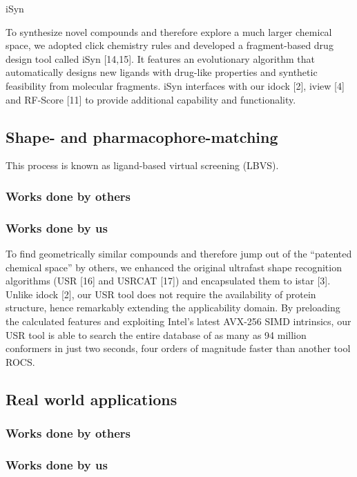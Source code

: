 \documentclass[a4paper,12pt]{article}
\begin{document}
iSyn \cite{1409,1387}

To synthesize novel compounds and therefore explore a much larger chemical space, we adopted click chemistry rules and developed a fragment-based drug design tool called iSyn [14,15]. It features an evolutionary algorithm that automatically designs new ligands with drug-like properties and synthetic feasibility from molecular fragments. iSyn interfaces with our idock [2], iview [4] and RF-Score [11] to provide additional capability and functionality.

\subsection*{Shape- and pharmacophore-matching}

This process is known as ligand-based virtual screening (LBVS).

\subsubsection*{Works done by others}


\subsubsection*{Works done by us}

To find geometrically similar compounds and therefore jump out of the “patented chemical space” by others, we enhanced the original ultrafast shape recognition algorithms (USR [16] and USRCAT [17]) and encapsulated them to istar [3]. Unlike idock [2], our USR tool does not require the availability of protein structure, hence remarkably extending the applicability domain. By preloading the calculated features and exploiting Intel’s latest AVX-256 SIMD intrinsics, our USR tool is able to search the entire database of as many as 94 million conformers in just two seconds, four orders of magnitude faster than another tool ROCS.

\subsection*{Real world applications}


\subsubsection*{Works done by others}


\subsubsection*{Works done by us}
\end{document}
